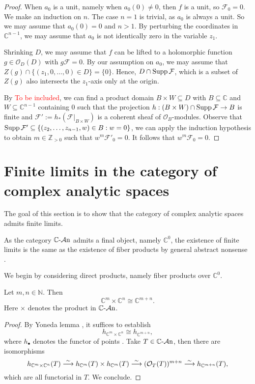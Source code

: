 \begin{proof}
    When $a_0$ is a unit, namely when $a_0(0)\neq 0$, then $f$ is a unit, so $\mathcal{F}_0=0$. We make an induction on $n$. The case $n=1$ is trivial, as $a_0$ is always a unit.
    So we may assume that $a_0(0)=0$ and $n>1$. By perturbing the coordinates in $\mathbb{C}^{n-1}$, we may assume that $a_0$ is not identically zero in the variable $z_1$. 
    
    Shrinking $D$, we may assume that $f$ can be lifted to a holomorphic function $g\in \mathcal{O}_D(D)$ with $g\mathcal{F}=0$. By our assumption on $a_0$, we may assume that $Z(g)\cap \{(z_1,0,\ldots,0)\in D\}=\{0\}$. Hence, $D\cap \operatorname{Supp} \mathcal{F}$, which is a subset of $Z(g)$ also intersects the $z_1$-axis only at the origin.

    By \textcolor{red}{To be included}, we can find a product domain $B\times W\subseteq D$ with $B\subseteq \mathbb{C}$ and $W\subseteq \mathbb{C}^{n-1}$ containing $0$ such that the projection $h:(B\times W)\cap \operatorname{Supp} \mathcal{F}\rightarrow B$ is finite and $\mathcal{F}':=h_*(\mathcal{F}|_{B\times W})$ is a coherent sheaf of $\mathcal{O}_B$-modules. Observe that $\operatorname{Supp} \mathcal{F}'\subseteq \{(z_2,\ldots,z_{n-1},w)\in B:w=0\}$, we can apply the induction hypothesis to obtain $m\in \mathbb{Z}_{>0}$ such that $w^{m}\mathcal{F}'_0=0$. It follows that $w^{m}\mathcal{F}_0=0$.
\end{proof}

\section{Finite limits in the category of complex analytic spaces}

The goal of this section is to show that the category of complex analytic spaces admits finite limits.

As the category $\mathbb{C}\text{-}\mathcal{A}\mathrm{n}$ admits a final object, namely $\mathbb{C}^0$, the existence of finite limits is the same as the existence of fiber products by general abstract nonsense \cite[\href{https://stacks.math.columbia.edu/tag/002O}{Tag 002O}]{stacks-project}.

We begin by considering direct products, namely fiber products over $\mathbb{C}^0$. 

\begin{lemma}\label{lma-CmCnproductexist}
Let $m,n\in \mathbb{N}$. Then 
\[
    \mathbb{C}^m\times \mathbb{C}^n\cong \mathbb{C}^{m+n}. 
\]    
Here $\times$ denotes the product in $\mathbb{C}\text{-}\mathcal{A}\mathrm{n}$.
\end{lemma}
\begin{proof}
    By Yoneda lemma \cite[\href{https://stacks.math.columbia.edu/tag/001P}{Tag 001P}]{stacks-project}, it suffices to establish
    \[
        h_{\mathbb{C}^m\times \mathbb{C}^n}\cong h_{\mathbb{C}^{m+n}},
    \]
    where $h_{\bullet}$ denotes the functor of points \cite[\href{https://stacks.math.columbia.edu/tag/001O}{Tag 001O}]{stacks-project}. Take $T\in \mathbb{C}\text{-}\mathcal{A}\mathrm{n}$, then there are isomorphisms
    \[
        h_{\mathbb{C}^m\times \mathbb{C}^n}(T)\stackrel{\sim}{\longrightarrow} h_{\mathbb{C}^m}(T)\times h_{\mathbb{C}^m}(T)\stackrel{\sim}{\longrightarrow} (\mathcal{O}_{T}(T))^{m+n}\stackrel{\sim}{\longrightarrow}   h_{\mathbb{C}^{m+n}}(T),
    \]
    which are all functorial in $T$. We conclude.
\end{proof}

